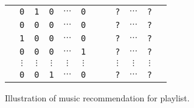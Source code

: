 \begin{figure}[!h]
\centering
{}  %
\setlength{\tabcolsep}{1pt} %
\begin{tabular}{|*{7}{c}|aaaaa|} \hline
\rule{0em}{10pt}
& \texttt{0} & \texttt{1} & \texttt{0} & $\cdots$ & \texttt{0} & & & \texttt{?} & $\cdots$ & \texttt{?} & \\
& \texttt{0} & \texttt{0} & \texttt{0} & $\cdots$ & \texttt{0} & & & \texttt{?} & $\cdots$ & \texttt{?} & \\
& \texttt{1} & \texttt{0} & \texttt{0} & $\cdots$ & \texttt{0} & & & \texttt{?} & $\cdots$ & \texttt{?} & \\
\vspace{-3pt}
& \texttt{0} & \texttt{0} & \texttt{0} & $\cdots$ & \texttt{1} & & & \texttt{?} & $\cdots$ & \texttt{?} & \\
& $\vdots$ & $\vdots$ & $\vdots$ & $\vdots$ & $\vdots$ & & & $\vdots$ & $\vdots$ & $\vdots$ & \\
& \texttt{0} & \texttt{0} & \texttt{1} & $\cdots$ & \texttt{0} & & & \texttt{?} & $\cdots$ & \texttt{?} & \\ \hline
\end{tabular}
\caption{Illustration of music recommendation for playlist.}
\label{fig:pla}
\end{figure}
